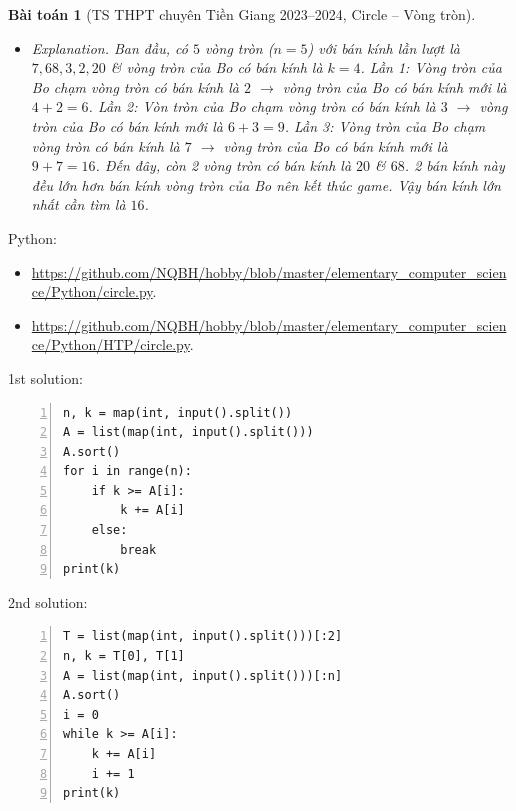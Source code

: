 \documentclass{article}
\newtheorem{baitoan}{Bài toán}
\begin{document}
\begin{baitoan}[TS THPT chuyên Tiền Giang 2023--2024, Circle -- Vòng tròn]
\begin{itemize}
		\item {\sf Explanation.} Ban đầu, có $5$ vòng tròn ($n = 5$) với bán kính lần lượt là $7,68,3,2,20$ \& vòng tròn của Bo có bán kính là $k = 4$. Lần 1: Vòng tròn của Bo chạm vòng tròn có bán kính là $2$ $\to$ vòng tròn của Bo có bán kính mới là $4 + 2 = 6$. Lần 2: Vòn tròn của Bo chạm vòng tròn có bán kính là $3$ $\to$ vòng tròn của Bo có bán kính mới là $6 + 3 = 9$. Lần 3: Vòng tròn của Bo chạm vòng tròn có bán kính là $7$ $\to$ vòng tròn của Bo có bán kính mới là $9 + 7 = 16$. Đến đây, còn 2 vòng tròn có bán kính là $20$ \& $68$. 2 bán kính này đều lớn hơn bán kính vòng tròn của Bo nên kết thúc game. Vậy bán kính lớn nhất cần tìm là $16$.
	\end{itemize}
\end{baitoan}
Python:
\begin{itemize}
	\item \url{https://github.com/NQBH/hobby/blob/master/elementary_computer_science/Python/circle.py}.
	\item \url{https://github.com/NQBH/hobby/blob/master/elementary_computer_science/Python/HTP/circle.py}.
\end{itemize}

\begin{multicols}{2}
1st solution:
\begin{Verbatim}[numbers=left,xleftmargin=5mm]
n, k = map(int, input().split())
A = list(map(int, input().split()))
A.sort()
for i in range(n):
    if k >= A[i]:
        k += A[i]
    else:
        break
print(k)
\end{Verbatim}
\columnbreak
2nd solution:
\begin{Verbatim}[numbers=left,xleftmargin=5mm]
T = list(map(int, input().split()))[:2]
n, k = T[0], T[1]
A = list(map(int, input().split()))[:n]
A.sort()
i = 0
while k >= A[i]:
    k += A[i]
    i += 1
print(k)
\end{Verbatim}
\end{multicols}
\end{document}
